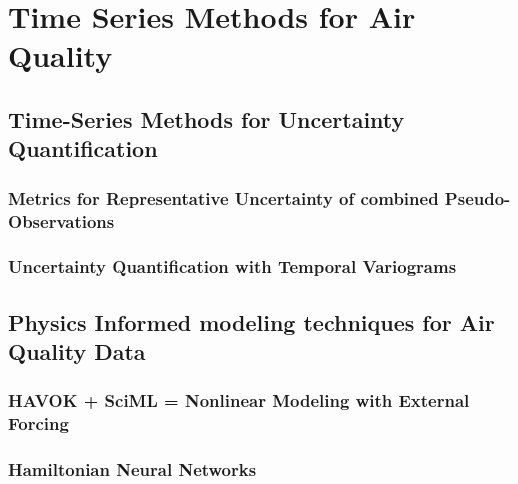 \chapter{Time Series Methods for Air Quality}

\section{Time-Series Methods for Uncertainty Quantification}
\subsection{Metrics for Representative Uncertainty of combined Pseudo-Observations}
\subsection{Uncertainty Quantification with Temporal Variograms}

\section{Physics Informed modeling techniques for Air Quality Data}
\subsection{HAVOK + SciML = Nonlinear Modeling with External Forcing}
\subsection{Hamiltonian Neural Networks}


